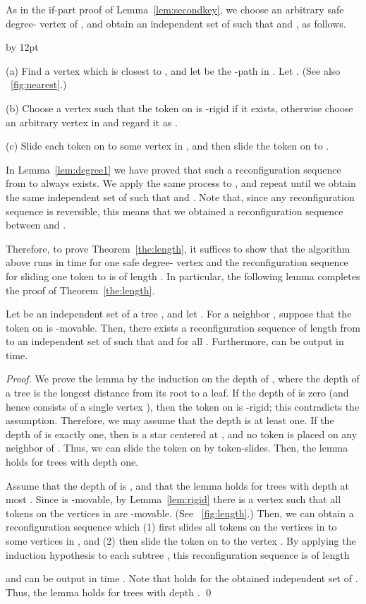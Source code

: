 \documentclass{llncs}
\newenvironment{listing}[1]{\begin{list}{*}{\settowidth{\labelwidth}{#1}\setlength{\leftmargin}{\labelwidth}\advance \leftmargin by 12pt
\setlength{\itemsep}{0pt}\setlength{\parsep}{0pt}\setlength{\topsep}{0pt}\setlength{\parskip}{0pt}}}{\end{list}}
\newcounter{one}
\begin{document}
	As in the if-part proof of Lemma~\ref{lem:secondkey}, we choose an arbitrary safe degree- vertex  of , and obtain an independent set  of  such that  and , as follows.
	\begin{listing}{aaa}
	\item[(a)] Find a vertex  which is closest to , and let  be the -path in .
					Let .
					(See also \figurename~\ref{fig:nearest}.)
	\item[(b)] Choose a vertex  such that the token on  is -rigid if it exists, otherwise choose an arbitrary vertex in  and regard it as . 
	\item[(c)] Slide each token on  to some vertex in , and then slide the token on  to .
	\end{listing}
	In Lemma~\ref{lem:degree1} we have proved that such a reconfiguration sequence from  to  always exists. 
	We apply the same process to , and repeat until we obtain the same independent set  of  such that  and . 
	Note that, since any reconfiguration sequence is reversible, this means that we obtained a reconfiguration sequence between  and . 
	
	Therefore, to prove Theorem~\ref{the:length}, it suffices to show that the algorithm above runs in  time for one safe degree- vertex  and the reconfiguration sequence for sliding one token to  is of length . 
	In particular, the following lemma completes the proof of Theorem~\ref{the:length}. 
	\begin{lemma} \label{lem:moving_root}
	Let  be an independent set of a tree , and let . 
	For a neighbor , suppose that the token on  is -movable. 
	Then, there exists a reconfiguration sequence  of length  from  to an independent set  of  such that  and  for all . 
	Furthermore,  can be output in  time.
	\end{lemma}
	\begin{proof}
	We prove the lemma by the induction on the depth of , where the depth of a tree is the longest distance from its root to a leaf.
	If the depth of  is zero (and hence  consists of a single vertex ), then the token on  is -rigid; 
this contradicts the assumption. 
	Therefore, we may assume that the depth is at least one.
	If the depth of  is exactly one, then  is a star centered at , and no token is placed on any neighbor of . 
	Thus, we can slide the token on  by   token-slides.
	Then, the lemma holds for trees with depth one.

	Assume that the depth of  is , and that the lemma holds for trees with depth at most .
	Since  is -movable, by Lemma~\ref{lem:rigid} there is a vertex  such that all tokens on the vertices  in  are -movable. 
(See \figurename~\ref{fig:length}.)
	Then, we can obtain a reconfiguration sequence which (1) first slides all tokens on the vertices  in  to some vertices in , and (2) then slide the token on  to the vertex .
	By applying the induction hypothesis to each subtree , this reconfiguration sequence is of length 
	
and can be output in time . 
	Note that  holds for the obtained independent set  of .
	Thus, the lemma holds for trees with depth . 
	\qed
	\end{proof}
\end{document}

